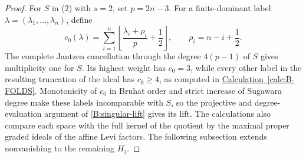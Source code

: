 \documentclass[11pt,a4paper]{amsart}
\numberwithin{equation}{section}
\theoremstyle{definition}
\theoremstyle{remark}
\begin{document}
\begin{proof}
For $S$ in (2) with $s=2$, set $p=2n-3$. For a finite-dominant
label $\lambda=(\lambda_1,\ldots,\lambda_n)$, define
$$
 c_0(\lambda)=\sum_{i=1}^n
 \left\lfloor\frac{\lambda_i+\rho_i}{p}+\frac12\right\rfloor,
 \qquad \rho_i=n-i+\frac12.
$$
The complete Jantzen cancellation through the degree $4(p-1)$ of $S$
gives multiplicity one for $S$. Its highest weight has $c_0=3$,
while every other label in the resulting truncation of the ideal
has $c_0\ge4$, as computed in
\hyperref[calc:B-FOLDS]{Calculation~\ref*{calc:B-FOLDS}}.
Monotonicity of $c_0$ in Bruhat order and strict increase of Sugawara
degree make these labels incomparable with $S$, so the projective and
degree-evaluation argument of \cref{B:singular-lift} gives its lift.
The calculations also compare each space with the full kernel of
the quotient by the maximal proper graded ideals of the affine Levi
factors. The following subsection extends nonvanishing to the remaining $H_j$.
\end{proof}
\end{document}
